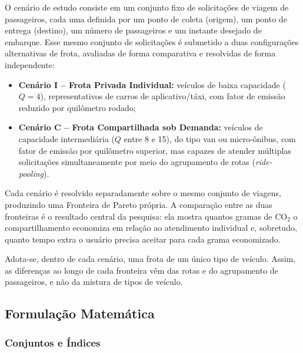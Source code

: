 \documentclass[12pt,a4paper]{article}
\theoremstyle{plain}
\begin{document}
O cenário de estudo consiste em um conjunto fixo de solicitações de viagem de passageiros, cada uma definida por um ponto de coleta (origem), um ponto de entrega (destino), um número de passageiros e um instante desejado de embarque. Esse mesmo conjunto de solicitações é submetido a duas configurações alternativas de frota, avaliadas de forma comparativa e resolvidas de forma independente:

\begin{itemize}
    \item \textbf{Cenário I -- Frota Privada Individual:} veículos de baixa capacidade ($Q = 4$), representativos de carros de aplicativo/táxi, com fator de emissão reduzido por quilômetro rodado;
    \item \textbf{Cenário C -- Frota Compartilhada sob Demanda:} veículos de capacidade intermediária ($Q$ entre 8 e 15), do tipo van ou micro-ônibus, com fator de emissão por quilômetro superior, mas capazes de atender múltiplas solicitações simultaneamente por meio do agrupamento de rotas (\textit{ride-pooling}).
\end{itemize}

Cada cenário é resolvido separadamente sobre o mesmo conjunto de viagens, produzindo uma Fronteira de Pareto própria. A comparação entre as duas fronteiras é o resultado central da pesquisa: ela mostra quantos gramas de $\text{CO}_2$ o compartilhamento economiza em relação ao atendimento individual e, sobretudo, quanto tempo extra o usuário precisa aceitar para cada grama economizado.

Adota-se, dentro de cada cenário, uma frota de um único tipo de veículo. Assim, as diferenças ao longo de cada fronteira vêm das rotas e do agrupamento de passageiros, e não da mistura de tipos de veículo.

\subsection{Formulação Matemática}

\subsubsection{Conjuntos e Índices}
\end{document}
